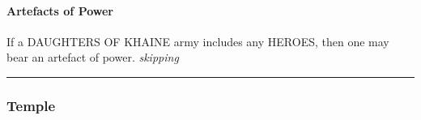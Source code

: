 \hypertarget{artefacts-of-power}{%
\paragraph{Artefacts of Power}\label{artefacts-of-power}}

If a DAUGHTERS OF KHAINE army includes any HEROES, then one may bear an
artefact of power. \emph{skipping}

\begin{center}\rule{0.5\linewidth}{\linethickness}\end{center}

\hypertarget{temple}{%
\subsubsection{Temple}\label{temple}}

